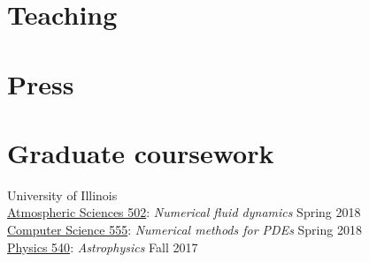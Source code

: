 \documentclass[12pt]{article}
\begin{document}
\section*{Teaching}

\ifdefined\withpress{}
\section*{Press}

\else\fi









\ifdefined\withcourses{}
\section*{Graduate coursework}

University of Illinois\\
\href{https://courses.illinois.edu/schedule/2018/spring/ATMS/502}{Atmospheric Sciences 502}: \textit{Numerical fluid dynamics} \hfill Spring 2018\\
\href{https://cs.illinois.edu/academics/courses/cs555}{Computer Science 555}: \textit{Numerical methods for PDEs} \hfill Spring 2018\\
\href{https://physics.illinois.edu/academics/courses/profile/PHYS\%20540}{Physics 540}: \textit{Astrophysics} \hfill Fall 2017

\else\fi
\end{document}
